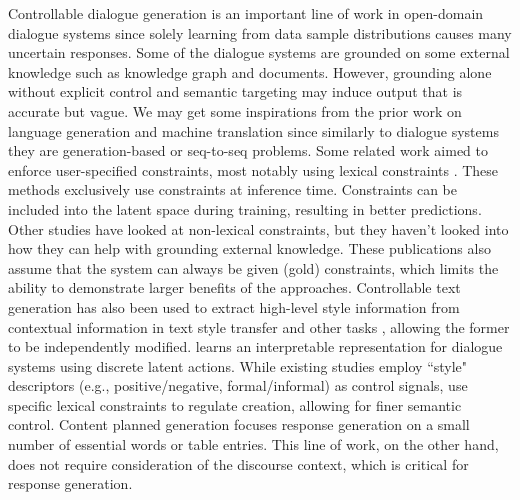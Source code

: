 \label{Controllable Generation}
Controllable dialogue generation is an important line of work in open-domain dialogue systems since solely learning from data sample distributions causes many uncertain responses. Some of the dialogue systems are grounded on some external knowledge such as knowledge graph and documents. However, grounding alone without explicit control and semantic targeting may induce output that is accurate but vague.
We may get some inspirations from the prior work on language generation and machine translation since similarly to dialogue systems they are generation-based or seq-to-seq problems. Some related work aimed to enforce user-specified constraints, most notably using lexical constraints . These methods exclusively use constraints at inference time. Constraints can be included into the latent space during training, resulting in better predictions. Other studies  have looked at non-lexical constraints, but they haven't looked into how they can help with grounding external knowledge. These publications also assume that the system can always be given (gold) constraints, which limits the ability to demonstrate larger benefits of the approaches.
Controllable text generation has also been used to extract high-level style information from contextual information in text style transfer  and other tasks , allowing the former to be independently modified.  learns an interpretable representation for dialogue systems using discrete latent actions. While existing studies employ ``style" descriptors (e.g., positive/negative, formal/informal) as control signals,  use specific lexical constraints to regulate creation, allowing for finer semantic control. Content planned generation  focuses response generation on a small number of essential words or table entries. This line of work, on the other hand, does not require consideration of the discourse context, which is critical for response generation.

